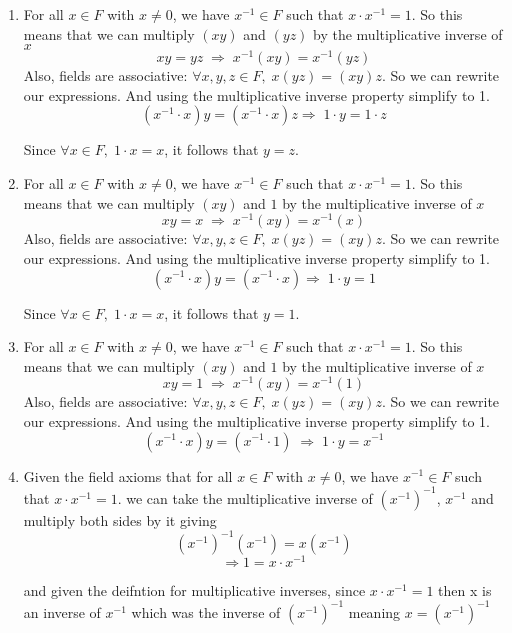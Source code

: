 \documentclass{report}
\begin{document}
\begin{proofWithHibiscus}
  \begin{enumerate}
    \item For all $x \in F$ with $x \neq 0$, we have $x^{-1} \in F$ such that 
    $x \cdot x^{-1} = 1$. So this means that we can multiply $(xy)$ and $(yz)$ by the multiplicative inverse of $x$
    \[ xy = yz \;\Rightarrow\; x^{-1}(xy) = x^{-1}(yz) \]
    Also, fields are associative: $\forall x,y,z \in F,\; x(yz) = (xy)z$. So we can rewrite our expressions. And using the multiplicative inverse property simplify to 1. 
    \[ (x^{-1} \cdot x) y = (x^{-1} \cdot x) z 
    \Rightarrow\; 1 \cdot y = 1 \cdot z \]

    Since $\forall x \in F,\; 1 \cdot x = x$, it follows that $y = z$.

    \item For all $x \in F$ with $x \neq 0$, we have $x^{-1} \in F$ such that 
    $x \cdot x^{-1} = 1$. So this means that we can multiply $(xy)$ and $1$ by the multiplicative inverse of $x$
    \[xy = x \;\Rightarrow\; x^{-1}(xy) = x^{-1}(x) \] 
    Also, fields are associative: $\forall x,y,z \in F,\; x(yz) = (xy)z$. So we can rewrite our expressions. And using the multiplicative inverse property simplify to 1. 
    \[ (x^{-1} \cdot x) y = (x^{-1} \cdot x) \Rightarrow\; 1 \cdot y = 1\]

    Since $\forall x \in F,\; 1 \cdot x = x$, it follows that $y = 1$.

    \item For all $x \in F$ with $x \neq 0$, we have $x^{-1} \in F$ such that 
    $x \cdot x^{-1} = 1$. So this means that we can multiply $(xy)$ and $1$ by the multiplicative inverse of $x$
    \[
    xy = 1 \;\Rightarrow\; x^{-1}(xy) = x^{-1}(1)
    \]
    Also, fields are associative: $\forall x,y,z \in F,\; x(yz) = (xy)z$. So we can rewrite our expressions. And using the multiplicative inverse property simplify to 1.
    \[
    (x^{-1} \cdot x) y = (x^{-1} \cdot 1) \;\Rightarrow\; 1 \cdot y = x^{-1}
    \]

    \item Given the field axioms that for all $x \in F$ with $x \neq 0$, we have $x^{-1} \in F$ such that 
    $x \cdot x^{-1} = 1$.  we can take the multiplicative inverse of $\left( x^{-1}\right)^{-1}$, $x^{-1}$ and multiply both sides by it giving
    \[ \left(x^{-1}\right)^{-1} \left(x^{-1}\right) 
        = x\left(x^{-1}\right) \]
    \[ \Rightarrow 1 = x \cdot x^{-1} \]

    and given the deifntion for multiplicative inverses, since $x \cdot x^{-1} = 1$ then x is an inverse of $x^{-1}$ which 
    was the inverse of $\left(x^{-1}\right)^{-1}$ meaning $x = \left(x^{-1}\right)^{-1}$
  \end{enumerate}
\end{proofWithHibiscus}
\end{document}
